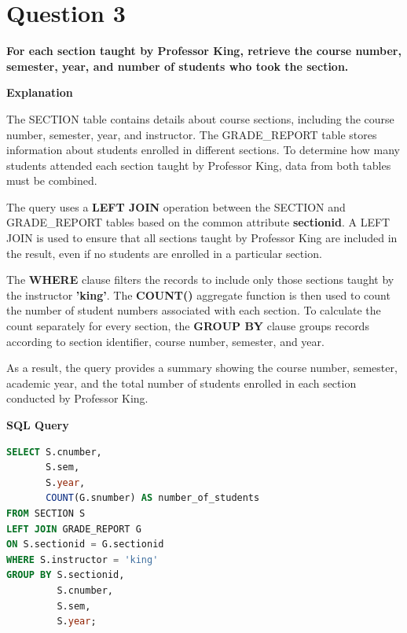 \documentclass[12pt,a4paper]{report}
\begin{document}
\vspace{-1cm}

\section*{Question 3}

\textbf{For each section taught by Professor King, retrieve the course number, semester, year, and number of students who took the section.}

\vspace{0.4cm}

\textbf{Explanation}

The SECTION table contains details about course sections, including the course number, semester, year, and instructor. The GRADE\_REPORT table stores information about students enrolled in different sections. To determine how many students attended each section taught by Professor King, data from both tables must be combined.

The query uses a \textbf{LEFT JOIN} operation between the SECTION and GRADE\_REPORT tables based on the common attribute \textbf{sectionid}. A LEFT JOIN is used to ensure that all sections taught by Professor King are included in the result, even if no students are enrolled in a particular section.

The \textbf{WHERE} clause filters the records to include only those sections taught by the instructor \textbf{'king'}. The \textbf{COUNT()} aggregate function is then used to count the number of student numbers associated with each section. To calculate the count separately for every section, the \textbf{GROUP BY} clause groups records according to section identifier, course number, semester, and year.

As a result, the query provides a summary showing the course number, semester, academic year, and the total number of students enrolled in each section conducted by Professor King.

\vspace{0.4cm}

\textbf{SQL Query}

\begin{lstlisting}[language=SQL]
SELECT S.cnumber,
       S.sem,
       S.year,
       COUNT(G.snumber) AS number_of_students
FROM SECTION S
LEFT JOIN GRADE_REPORT G
ON S.sectionid = G.sectionid
WHERE S.instructor = 'king'
GROUP BY S.sectionid,
         S.cnumber,
         S.sem,
         S.year;
\end{lstlisting}
\end{document}
